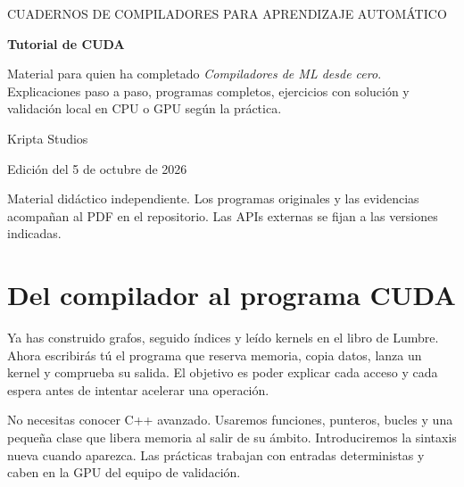 \documentclass[12pt,a4paper,oneside]{report}
\begin{document}
\hypersetup{pageanchor=false}
\begin{titlepage}\centering\vspace*{1.5cm}
{\large CUADERNOS DE COMPILADORES PARA APRENDIZAJE AUTOMÁTICO\par}\vspace{1.4cm}
{\Huge\bfseries Tutorial de CUDA\par}\vspace{1cm}
\begin{minipage}{.85\textwidth}Material para quien ha completado \emph{Compiladores de ML desde cero}. Explicaciones paso a paso, programas completos, ejercicios con solución y validación local en CPU o GPU según la práctica.\end{minipage}\vfill
{\large Kripta Studios\par}\vspace{.4cm}Edición del 5 de octubre de 2026\par\vspace{.5cm}
{\small Material didáctico independiente. Los programas originales y las evidencias acompañan al PDF en el repositorio. Las APIs externas se fijan a las versiones indicadas.\par}\end{titlepage}
\hypersetup{pageanchor=true}
\chapter{Del compilador al programa CUDA}
\label{cuda:inicio}
Ya has construido grafos, seguido índices y leído kernels en el libro de Lumbre. Ahora escribirás tú el programa que reserva memoria, copia datos, lanza un kernel y comprueba su salida. El objetivo es poder explicar cada acceso y cada espera antes de intentar acelerar una operación.

No necesitas conocer C++ avanzado. Usaremos funciones, punteros, bucles y una pequeña clase que libera memoria al salir de su ámbito. Introduciremos la sintaxis nueva cuando aparezca. Las prácticas trabajan con entradas deterministas y caben en la GPU del equipo de validación.
\end{document}
